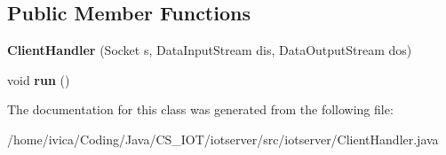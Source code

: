 \subsection*{Public Member Functions}
\begin{DoxyCompactItemize}
\item 
\mbox{\label{classiotserver_1_1ClientHandler_a398c6a2929211d5a5195097e4be514f4}} 
{\bfseries Client\+Handler} (Socket s, Data\+Input\+Stream dis, Data\+Output\+Stream dos)
\item 
\mbox{\label{classiotserver_1_1ClientHandler_a789667c4064f8281f810a02bcde2ba1f}} 
void {\bfseries run} ()
\end{DoxyCompactItemize}


The documentation for this class was generated from the following file\+:\begin{DoxyCompactItemize}
\item 
/home/ivica/\+Coding/\+Java/\+C\+S\+\_\+\+I\+O\+T/iotserver/src/iotserver/Client\+Handler.\+java\end{DoxyCompactItemize}
